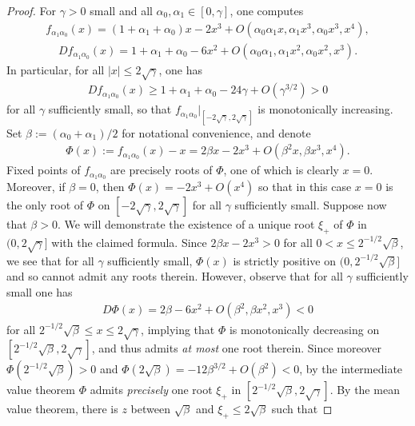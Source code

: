 \documentclass{article}
\theoremstyle{plain}
\theoremstyle{definition}
\theoremstyle{remark}
\begin{document}
\begin{proof}
    For $\gamma>0$ small and all $\alpha_0,\alpha_1\in[0,\gamma]$, one computes
    \begin{align}
        f_{\alpha_1\alpha_0}(x) = (1+\alpha_1+\alpha_0)x-2x^3 + O(\alpha_0\alpha_1 x,\alpha_1 x^3, \alpha_0x^3,x^4),
    \end{align}
    \begin{align}
        Df_{\alpha_1\alpha_0}(x) = 1+\alpha_1+\alpha_0-6x^2 + O(\alpha_0\alpha_1 ,\alpha_1 x^2, \alpha_0x^2,x^3).
    \end{align}
    In particular, for all $|x|\leq 2\sqrt{\gamma}$, one has
    \begin{align}
        Df_{\alpha_1\alpha_0}(x)\geq 1 + \alpha_1+\alpha_0-24\gamma + O(\gamma^{3/2})>0
    \end{align}
    for all $\gamma$ sufficiently small, so that $f_{\alpha_1\alpha_0}|_{[-2\sqrt{\gamma},2\sqrt{\gamma}]}$ is monotonically increasing. Set $\beta:=(\alpha_0+\alpha_1)/2$ for notational convenience, and denote
    \begin{align}
        \Phi(x):=f_{\alpha_1\alpha_0}(x)-x = 2\beta x- 2x^3 + O(\beta^2 x, \beta x^3, x^4).
    \end{align}
    Fixed points of $f_{\alpha_1\alpha_0}$ are precisely roots of $\Phi$, one of which is clearly $x = 0$. Moreover, if $\beta = 0$, then $\Phi(x) = -2x^3 + O(x^4)$ so that in this case $x = 0$ is the only root of $\Phi$ on $[-2\sqrt{\gamma},2\sqrt{\gamma}]$ for all $\gamma$ sufficiently small. Suppose now that $\beta>0$. We will demonstrate the existence of a unique root $\xi_+$ of $\Phi$ in $(0,2\sqrt{\gamma}]$ with the claimed formula. Since $2\beta x-2x^3 >0$ for all $0<x\leq 2^{-1/2}\sqrt{\beta}$, we see that for all $\gamma$ sufficiently small, $\Phi(x)$ is strictly positive on $(0,2^{-1/2}\sqrt{\beta}]$ and so cannot admit any roots therein. However, observe that for all $\gamma$ sufficiently small one has
    \begin{align}
        D\Phi(x) = 2\beta-6x^2 + O(\beta^2,\beta x^2,x^3)<0
    \end{align}
    for all $2^{-1/2}\sqrt{\beta}\leq x\leq 2\sqrt{\gamma}$, implying that $\Phi$ is monotonically decreasing on $[2^{-1/2}\sqrt{\beta},2\sqrt{\gamma}]$, and thus admits \emph{at most} one root therein. Since moreover $\Phi(2^{-1/2}\sqrt{\beta})>0$ and $\Phi(2\sqrt{\beta}) = -12\beta^{3/2}+O(\beta^2)<0$, by the intermediate value theorem $\Phi$ admits \emph{precisely} one root $\xi_+$ in $[2^{-1/2}\sqrt{\beta},2\sqrt{\gamma}]$. By the mean value theorem, there is $z$ between $\sqrt{\beta}$ and $\xi_+\leq 2\sqrt{\beta}$ such that

\end{proof}
\end{document}
